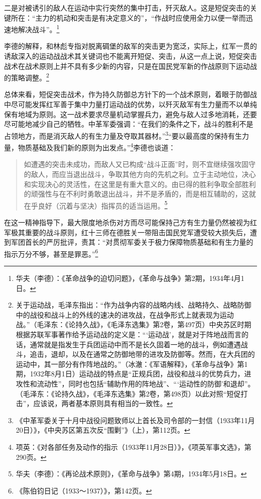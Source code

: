 二是对被诱引的敌人在运动中实行突然的集中打击，歼灭敌人。这是短促突击的关键所在：“主力的机动和突击是有决定意义的”，“作战时应使用全力以便一举而迅速地解决战斗”。\footnote{华夫（李德）：《革命战争的迫切问题》，《革命与战争》第2期，1934年4月1日。}


李德的解释，和林彪专指对脱离碉堡的敌军的突击更为宽泛，实际上，红军一贯的诱敌深入的运动战战术其关键词也不能离开短促、突击，从这一点上说，短促突击战术在战术原则上并不具有多少新的内容，只是在国民党军新的作战原则下运动战的策略调整。\footnote{关于运动战，毛泽东指出：“作为战争内容的战略内线、战略持久、战略防御中的战役和战斗上的外线的速决的进攻战，在战争形式上就表现为运动战。”（毛泽东：《论持久战》，《毛泽东选集》第2卷，第497页）中央苏区时期根据苏联军事著作给予运动战的定义是：“‘运动战’，就是对于阵地战而言的话，通常就是指发生于兵团运动中而不是长久固着一地的战斗，例如遭遇战斗，追击，退却，以及在通常之防御地带的进攻及防御等。然而，在大兵团的运动中，其一部分有作阵地战的。”（冰澈：《军语解释》，《革命与战争》第1期，1932年8月1日）运动战的特点是“正规兵团，战役和战斗的优势兵力，进攻性和流动性”，同时也包括“辅助作用的阵地战”、“‘运动性的防御’和退却”。（毛泽东：《论持久战》，《毛泽东选集》第2卷，第498页）以此对照“短促打击”，应该说，两者基本原则具有相当的一致性。}


总体来看，短促突击战术，作为持久防御总方针下的一个战术原则，着眼于防御战中尽可能发挥红军善于集中力量打运动战的优势，以歼灭敌军有生力量而不以单纯保有地域为原则。这一战术要求尽量机动掌握兵力，避免与敌人过多地消耗，还要尽可能地减少自己的牺牲。中革军委强调：“在我们的条件之下，战斗的胜利不是占领地方，而是消灭敌人的有生力量及夺取其器材。”\footnote{《中革军委关于十月中战役问题致师以上首长及司令部的一封信（1933年11月20日）》，《中央苏区第五次反“围剿”》（上），第112页。}“要以最高度的保持有生力量，物质基础及我们新的原则为出发点。”\footnote{项英：《对各部任务及动作的指示（1933年11月28日）》，《项英军事文选》，第290页。}李德也谈道：

\begin{quote}

如遭遇的突击未成功，而敌人又已构成“战斗正面”时，则不宜继续强攻固守的敌人，而应当退出战斗，争取其他方向的先机之利。立于主动地位，决心和实现决心的灵活性，在这里是有重大意义的。由已得的胜利争取全部胜利的顽强性与在不利时勇敢退出战斗，并不是矛盾的，而是相互辅助的，这就在乎良好（沉着与坚决）指挥员的适当运用。\footnote{华夫（李德）：《再论战术原则》，《革命与战争》第4期，1934年5月18日。}
\end{quote}


在这一精神指导下，最大限度地杀伤对方而尽可能保持己方有生力量仍然被视为红军极其重要的战斗原则，红十三师在德胜关一带阻击国民党军遭受较大损失后，遭到军团首长的严厉批评，责其：“对贯彻军委关于极力保障物质基础和有生力量的指示万分不够，甚至是罪恶。”\footnote{《陈伯钧日记（1933～1937）》，第142页。}


